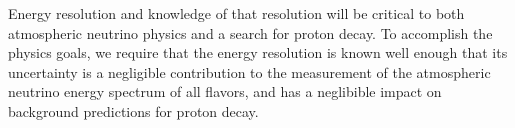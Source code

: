 Energy resolution and knowledge of that resolution will be critical to both
atmospheric neutrino physics and a search for proton decay.  To accomplish the
physics goals, we require that the energy resolution is known well enough that
its uncertainty is a negligible contribution to the measurement of the
atmospheric neutrino energy spectrum of all flavors, and has a neglibible
impact on background predictions for proton decay.




